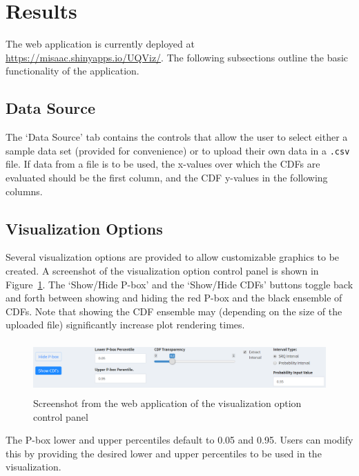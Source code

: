 \documentclass[11pt]{asaproc}\usepackage[]{graphicx}\usepackage[]{color}
\begin{document}
\section{Results}
\label{Results}

The web application is currently deployed at \url{https://misaac.shinyapps.io/UQViz/}. The following subsections outline the basic functionality of the application. 

\subsection{Data Source}
The `Data Source' tab contains the controls that allow the user to select either a sample data set (provided for convenience) or to upload their own data in a {\tt .csv} file. If data from a file is to be used, the x-values over which the CDFs are evaluated should be the first column, and the CDF y-values in the following columns. 

\subsection{Visualization Options}
Several visualization options are provided to allow customizable graphics to be created. A screenshot of the visualization option control panel is shown in Figure~\ref{tab_vo}. The `Show/Hide P-box' and the `Show/Hide CDFs' buttons toggle back and forth between showing and hiding the red P-box and the black ensemble of CDFs. Note that showing the CDF ensemble may (depending on the size of the uploaded file) significantly increase plot rendering times.

\begin{figure}[t]
\begin{center} 
\includegraphics[height=2cm,width=14cm]{figures2/tab_vo.png}
\end{center} 
\caption{\label{tab_vo}Screenshot from the web application of the visualization option control panel}
\end{figure}

The P-box lower and upper percentiles default to 0.05 and 0.95. Users can modify this by providing the desired lower and upper percentiles to be used in the visualization. 
\end{document}
